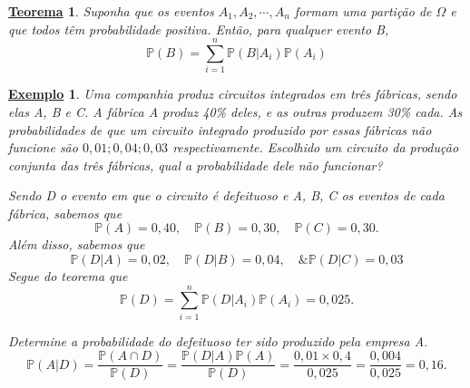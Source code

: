 \documentclass{article}
\newtheorem*{theorem*}{\underline{Teorema}}
\newtheorem{example}{\underline{Exemplo}}
\begin{document}
\begin{theorem*}
  Suponha que os eventos \(A_{1}, A_{2}, \cdots, A_{n}\) formam uma partição de \(\Omega \) e que todos têm probabilidade positiva. Então, para qualquer evento B, 
    \[
      \mathbb{P}(B) = \sum\limits_{i=1}^{n}\mathbb{P}(B|A_{i})\mathbb{P}(A_{i})
    \]
\end{theorem*}
\begin{example}
  Uma companhia produz circuitos integrados em três fábricas, sendo elas A, B e C. A fábrica A produz 40\% deles, e as outras produzem 30\% cada. As probabilidades de que um circuito integrado produzido por essas fábricas não funcione são 
 \(0,01; 0,04; 0,03\) respectivamente. Escolhido um circuito da produção conjunta das três fábricas, qual a probabilidade dele não funcionar? 
  
  Sendo D o evento em que o circuito é defeituoso e A, B, C os eventos de cada fábrica, sabemos que 
    \[
      \mathbb{P}(A) = 0,40,\quad \mathbb{P}(B) = 0,30,\quad \mathbb{P}(C) = 0,30.
    \]
    Além disso, sabemos que 
    \[
      \mathbb{P}(D|A) = 0,02,\quad \mathbb{P}(D|B) = 0,04,\quad \& \mathbb{P}(D|C) = 0,03
    \]
    Segue do teorema que 
      \[
        \mathbb{P}(D) = \sum\limits_{i=1}^{n}\mathbb{P}(D|A_{i})\mathbb{P}(A_{i}) = 0,025.
      \]

    Determine a probabilidade do defeituoso ter sido produzido pela empresa A. 
      \[
        \mathbb{P}(A|D) = \frac{\mathbb{P}(A\cap D)}{\mathbb{P}(D)} = \frac{\mathbb{P}(D|A)\mathbb{P}(A)}{\mathbb{P}(D)} = \frac{0,01\times 0,4}{0,025} = \frac{0,004}{0,025} = 0,16.
      \]
\end{example}
\end{document}

